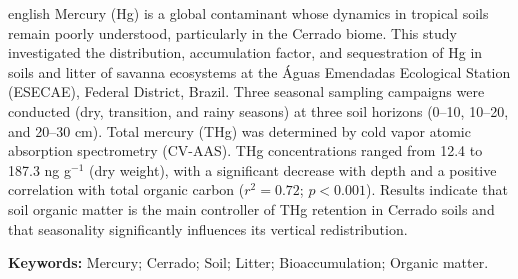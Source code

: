 \documentclass[
  12pt,
  openany,   %
  oneside,   %
  a4paper,
  english, brazil, sumario=tradicional
]{abntex2}
\newif\ifingles
\newcommand{\tipodotrabalho}{Projeto de Mestrado}
\newcommand{\tipodotrabalho}{Projeto de Doutorado}
\newcommand{\tipodotrabalho}{Dissertação de Mestrado}
\newcommand{\tipodotrabalho}{Tese de Doutorado}
\newcommand{\MesAno}{Mês/Ano}
\newcommand{\refbibliografica}{%
  SOBRENOME, Nome. \textit{\imprimirtitulo}. \MesAno. N~f.
  \tipodotrabalho~-- Programa de Pós-Graduação em Ciências Ambientais,
  Faculdade UnB de Planaltina, Universidade de Brasília, Brasília, \MesAno.}
\renewcommand{\lstlistlistingname}{List of Listings}
\renewcommand{\lstlistlistingname}{Lista de Códigos}
\begin{document}
\begin{resumo}[Abstract]
  \begin{otherlanguage*}{english}
    \OnehalfSpacing
    Mercury (Hg) is a global contaminant whose dynamics in tropical soils
    remain poorly understood, particularly in the Cerrado biome. This study
    investigated the distribution, accumulation factor, and sequestration of
    Hg in soils and litter of savanna ecosystems at the Águas Emendadas
    Ecological Station (ESECAE), Federal District, Brazil. Three seasonal
    sampling campaigns were conducted (dry, transition, and rainy seasons)
    at three soil horizons (0--10, 10--20, and 20--30 cm). Total mercury
    (THg) was determined by cold vapor atomic absorption spectrometry
    (CV-AAS). THg concentrations ranged from 12.4 to 187.3 ng g$^{-1}$
    (dry weight), with a significant decrease with depth and a positive
    correlation with total organic carbon ($r^2 = 0.72$; $p < 0.001$).
    Results indicate that soil organic matter is the main controller of
    THg retention in Cerrado soils and that seasonality significantly
    influences its vertical redistribution.

    \vspace{\onelineskip}
    \noindent
    \textbf{Keywords:} Mercury; Cerrado; Soil; Litter;
    Bioaccumulation; Organic matter.
  \end{otherlanguage*}
\end{resumo}

\listoffigures*
\clearpage

\listoftables*
\clearpage

\pdfbookmark[0]{\lstlistlistingname}{lol}
\lstlistoflistings
\clearpage
\end{document}

